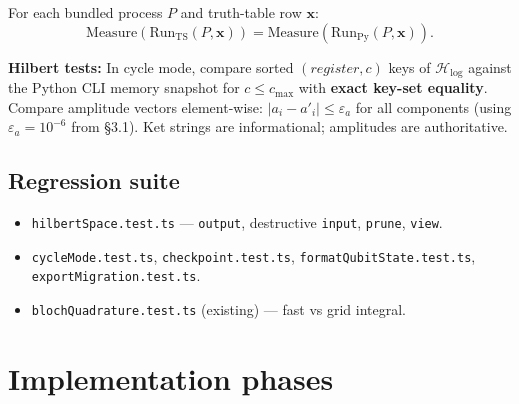 \documentclass[11pt,a4paper]{article}
\newcommand{\HS}{\mathcal{H}_{\mathrm{log}}}
\begin{document}
For each bundled process $P$ and truth-table row $\mathbf{x}$:
\begin{equation}
  \mathrm{Measure}(\mathrm{Run}_{\mathrm{TS}}(P,\mathbf{x})) =
  \mathrm{Measure}(\mathrm{Run}_{\mathrm{Py}}(P,\mathbf{x})).
\end{equation}

\textbf{Hilbert tests:} In cycle mode, compare sorted $(\mathit{register},c)$ keys of $\HS$ against the Python CLI memory snapshot for $c\le c_{\max}$ with \textbf{exact key-set equality}. Compare amplitude vectors element-wise: $|a_i-a'_i|\le\varepsilon_a$ for all components (using $\varepsilon_a=10^{-6}$ from \S3.1). Ket strings are informational; amplitudes are authoritative.

\subsection{Regression suite}

\begin{itemize}
  \item \texttt{hilbertSpace.test.ts} --- \texttt{output}, destructive \texttt{input}, \texttt{prune}, \texttt{view}.
  \item \texttt{cycleMode.test.ts}, \texttt{checkpoint.test.ts}, \texttt{formatQubitState.test.ts}, \texttt{exportMigration.test.ts}.
  \item \texttt{blochQuadrature.test.ts} (existing) --- fast vs grid integral.
\end{itemize}

\section{Implementation phases}
\end{document}
